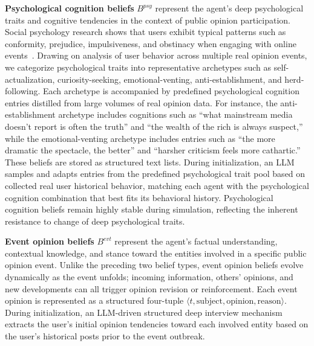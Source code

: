 \documentclass[a4paper,fleqn]{cas-dc}
\begin{document}
\textbf{Psychological cognition beliefs} $B^{psy}$ represent the agent's deep psychological traits and cognitive tendencies in the context of public opinion participation. Social psychology research shows that users exhibit typical patterns such as conformity, prejudice, impulsiveness, and obstinacy when engaging with online events~\citep{buckels2014trolls}. Drawing on analysis of user behavior across multiple real opinion events, we categorize psychological traits into representative archetypes such as self-actualization, curiosity-seeking, emotional-venting, anti-establishment, and herd-following. Each archetype is accompanied by predefined psychological cognition entries distilled from large volumes of real opinion data. For instance, the anti-establishment archetype includes cognitions such as ``what mainstream media doesn't report is often the truth'' and ``the wealth of the rich is always suspect,'' while the emotional-venting archetype includes entries such as ``the more dramatic the spectacle, the better'' and ``harsher criticism feels more cathartic.'' These beliefs are stored as structured text lists. During initialization, an LLM samples and adapts entries from the predefined psychological trait pool based on collected real user historical behavior, matching each agent with the psychological cognition combination that best fits its behavioral history. Psychological cognition beliefs remain highly stable during simulation, reflecting the inherent resistance to change of deep psychological traits.

\textbf{Event opinion beliefs} $B^{evt}$ represent the agent's factual understanding, contextual knowledge, and stance toward the entities involved in a specific public opinion event. Unlike the preceding two belief types, event opinion beliefs evolve dynamically as the event unfolds; incoming information, others' opinions, and new developments can all trigger opinion revision or reinforcement. Each event opinion is represented as a structured four-tuple $\langle t, \text{subject}, \text{opinion}, \text{reason} \rangle$. During initialization, an LLM-driven structured deep interview mechanism extracts the user's initial opinion tendencies toward each involved entity based on the user's historical posts prior to the event outbreak.
\end{document}
